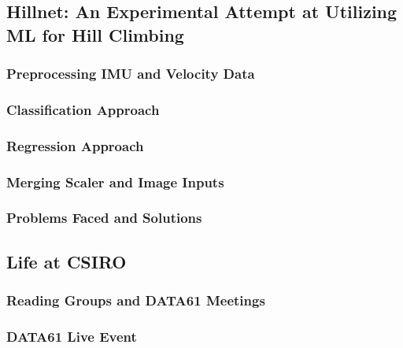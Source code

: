 \newpage
\subsection{Hillnet: An Experimental Attempt at Utilizing ML for Hill Climbing}

\subsubsection{Preprocessing IMU and Velocity Data}

\subsubsection{Classification Approach}

\subsubsection{Regression Approach}

\subsubsection{Merging Scaler and Image Inputs}

\subsubsection{Problems Faced and Solutions}



\newpage
\subsection{Life at CSIRO}
    

\subsubsection{Reading Groups and DATA61 Meetings}

\subsubsection{DATA61 Live Event}

